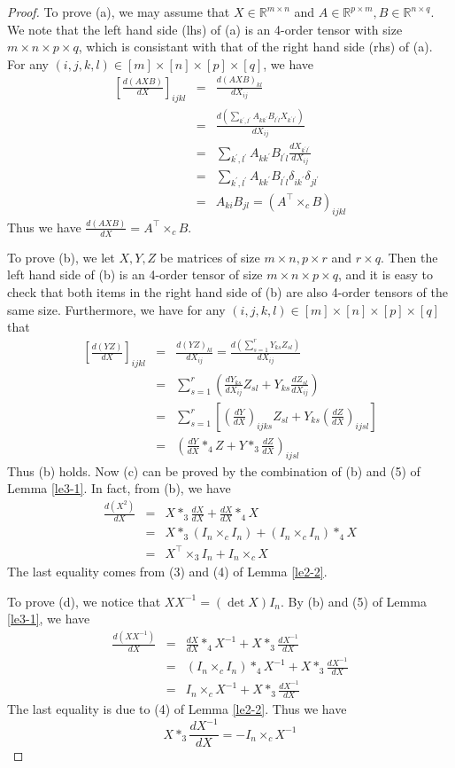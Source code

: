 \documentclass[10pt,a4paper]{amsart}
\newcommand{\RR}{\mathbb{R}}
\newcommand{\beq}{\begin{equation}}
\newcommand{\beyy}{\begin{eqnarray*}}
\newcommand{\eeq}{\end{equation}}
\newcommand{\eeyy}{\end{eqnarray*}}
\newcommand{\p}{\prime}
\begin{document}
\begin{proof}
To prove (a), we may assume that $X\in\RR^{m\times n}$ and $A\in\RR^{p\times m}, B\in\RR^{n\times q}$.  We note that the left hand side (lhs) of (a) is an 4-order tensor with size $m\times n\times p\times q$, which is consistant with that of the right hand side (rhs) of (a). For any 
$(i,j,k,l)\in [m]\times [n]\times [p]\times [q]$, we have 
\beyy 
\left[\frac{d (AXB)}{d X}\right]_{ijkl} 
&=&\frac{d (AXB)_{kl}}{d X_{ij}}\\
&=&\frac{d (\sum_{k^{\p},l^{\p}}A_{kk^{\p}}B_{l^{\p}l}X_{k^{\p}l^{\p}})}{d X_{ij}}\\    
&=&\sum_{k^{\p},l^{\p}}A_{kk^{\p}}B_{l^{\p}l} \frac{d X_{k^{\p}l^{\p}}}{d X_{ij}}\\ 
&=&\sum_{k^{\p},l^{\p}}A_{kk^{\p}}B_{l^{\p}l} \delta_{i k^{\p}}\delta_{j l^{\p}}\\ 
&=&A_{ki}B_{jl} = \left( A^{\top}\times_{c} B\right)_{ijkl}
\eeyy
Thus we have $\frac{d (AXB)}{d X}=A^{\top}\times_{c} B$. \par 
\indent To prove (b), we let $X,Y,Z$ be matrices of size $m\times n, p\times r$ and $r\times q$.  Then the left hand side of (b) is an 4-order tensor of size 
$m\times n\times p\times q$, and it is easy to check that both items in the right hand side of (b) are also 4-order tensors of the same size. Furthermore, 
we have for any $(i,j,k,l)\in [m]\times [n]\times [p]\times [q]$ that  
\beyy 
\left[\frac{d (YZ)}{d X}\right]_{ijkl}&=&\frac{d (YZ)_{kl}}{d X_{ij}}=\frac{d (\sum_{s=1}^{r}Y_{ks}Z_{sl})}{d X_{ij}}\\    
&=&\sum_{s=1}^{r}\left( \frac{d Y_{ks}}{d X_{ij}} Z_{sl} + Y_{ks} \frac{d Z_{sl}}{d X_{ij}}\right) \\ 
&=&\sum_{s=1}^{r}\left[ \left(\frac{d Y}{d X}\right)_{ijks} Z_{sl} + Y_{ks}\left(\frac{d Z}{d X}\right)_{ijsl}\right] \\ 
&=&\left( \frac{dY}{dX}\ast_{4}Z +Y\ast_{3}\frac{dZ}{dX}\right)_{ijsl}
\eeyy 
Thus (b) holds.  Now (c) can be proved by the combination of (b) and (5) of Lemma \ref{le3-1}. In fact, from (b), we have 
 \beyy 
\frac{d (X^{2})}{d X}
& = &X\ast_{3}\frac{dX}{d X} + \frac{dX}{dX}\ast_{4} X \\
& = &X\ast_{3}(I_{n}\times_{c} I_{n}) + (I_{n}\times_{c} I_{n}) \ast_{4} X \\ 
& = &X^{\top}\times_{3} I_{n} + I_{n}\times_{c} X     
\eeyy
The last equality comes from (3) and (4) of  Lemma \ref{le2-2}. \par
\indent To prove (d), we notice that $XX^{-1} = (\det X) I_{n}$.  By (b) and (5) of Lemma \ref{le3-1}, we have 
\beyy
\frac{d(XX^{-1})}{dX} 
&=& \frac{dX}{dX}\ast_{4} X^{-1} + X\ast_{3}\frac{d X^{-1}}{dX}\\
&=& (I_{n}\times_{c} I_{n}) \ast_{4} X^{-1} + X\ast_{3} \frac{d X^{-1}}{dX}\\
&=& I_{n}\times_{c} X^{-1} + X\ast_{3} \frac{d X^{-1}}{dX}
\eeyy
The last equality is due to (4) of Lemma \ref{le2-2}.  Thus we have 
\beq\label{eq:le3-2-1}
X\ast_{3} \frac{d X^{-1}}{dX} = - I_{n}\times_{c} X^{-1} 
\eeq
\end{proof}
\end{document}
